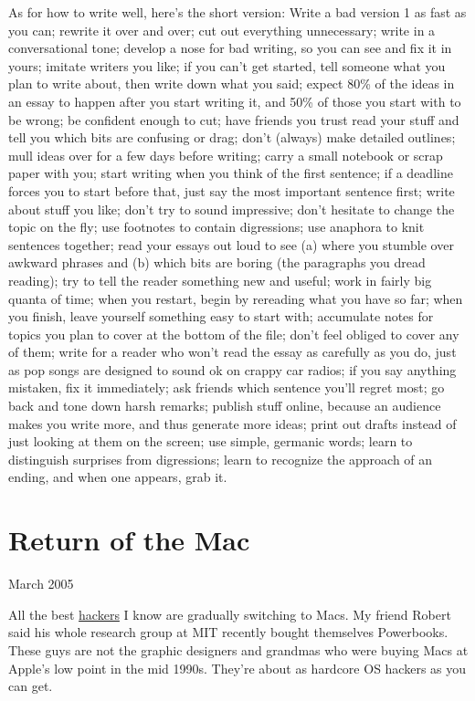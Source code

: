 \documentclass[12pt]{book}
\begin{document}
As for how to write well, here's the short version: Write a bad version
1 as fast as you can; rewrite it over and over; cut out everything
unnecessary; write in a conversational tone; develop a nose for bad
writing, so you can see and fix it in yours; imitate writers you like;
if you can't get started, tell someone what you plan to write about,
then write down what you said; expect 80\% of the ideas in an essay to
happen after you start writing it, and 50\% of those you start with to
be wrong; be confident enough to cut; have friends you trust read your
stuff and tell you which bits are confusing or drag; don't (always) make
detailed outlines; mull ideas over for a few days before writing; carry
a small notebook or scrap paper with you; start writing when you think
of the first sentence; if a deadline forces you to start before that,
just say the most important sentence first; write about stuff you like;
don't try to sound impressive; don't hesitate to change the topic on the
fly; use footnotes to contain digressions; use anaphora to knit
sentences together; read your essays out loud to see (a) where you
stumble over awkward phrases and (b) which bits are boring (the
paragraphs you dread reading); try to tell the reader something new and
useful; work in fairly big quanta of time; when you restart, begin by
rereading what you have so far; when you finish, leave yourself
something easy to start with; accumulate notes for topics you plan to
cover at the bottom of the file; don't feel obliged to cover any of
them; write for a reader who won't read the essay as carefully as you
do, just as pop songs are designed to sound ok on crappy car radios; if
you say anything mistaken, fix it immediately; ask friends which
sentence you'll regret most; go back and tone down harsh remarks;
publish stuff online, because an audience makes you write more, and thus
generate more ideas; print out drafts instead of just looking at them on
the screen; use simple, germanic words; learn to distinguish surprises
from digressions; learn to recognize the approach of an ending, and when
one appears, grab it.
\chapter{Return of the Mac}

March 2005

All the best \href{gba.html}{hackers} I know are gradually switching to
Macs. My friend Robert said his whole research group at MIT recently
bought themselves Powerbooks. These guys are not the graphic designers
and grandmas who were buying Macs at Apple's low point in the mid 1990s.
They're about as hardcore OS hackers as you can get.
\end{document}
